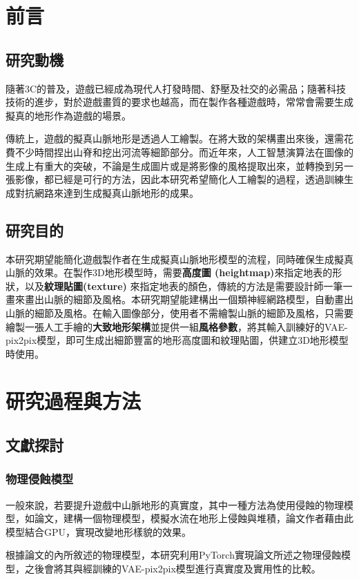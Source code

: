\documentclass[a4paper, 12pt]{article}
\begin{document}
\newpage
{}

\section{前言}
\subsection{研究動機}
隨著3C的普及，遊戲已經成為現代人打發時間、舒壓及社交的必需品；隨著科技技術的進步，對於遊戲畫質的要求也越高，而在製作各種遊戲時，常常會需要生成擬真的地形作為遊戲的場景。

傳統上，遊戲的擬真山脈地形是透過人工繪製。在將大致的架構畫出來後，還需花費不少時間捏出山脊和挖出河流等細節部分。而近年來，人工智慧演算法在圖像的生成上有重大的突破，不論是生成圖片或是將影像的風格提取出來，並轉換到另一張影像，都已經是可行的方法，因此本研究希望簡化人工繪製的過程，透過訓練生成對抗網路來達到生成擬真山脈地形的成果。

\subsection{研究目的}
本研究期望能簡化遊戲製作者在生成擬真山脈地形模型的流程，同時確保生成擬真山脈的效果。在製作3D地形模型時，需要\textbf{高度圖 (heightmap)}來指定地表的形狀，以及\textbf{紋理貼圖(texture)} 來指定地表的顏色，傳統的方法是需要設計師一筆一畫來畫出山脈的細節及風格。本研究期望能建構出一個類神經網路模型，自動畫出山脈的細節及風格。在輸入圖像部分，使用者不需繪製山脈的細節及風格，只需要繪製一張人工手繪的\textbf{大致地形架構}並提供一組\textbf{風格參數}，將其輸入訓練好的VAE-pix2pix模型，即可生成出細節豐富的地形高度圖和紋理貼圖，供建立3D地形模型時使用。
\section{研究過程與方法}
\subsection{文獻探討}
\subsubsection{物理侵蝕模型}
一般來說，若要提升遊戲中山脈地形的真實度，其中一種方法為使用侵蝕的物理模型，如論文\cite{jako2011fast}，建構一個物理模型，模擬水流在地形上侵蝕與堆積，論文作者藉由此模型結合GPU，實現改變地形樣貌的效果。

根據論文\cite{jako2011fast}的內所敘述的物理模型，本研究利用PyTorch實現論文\cite{jako2011fast}所述之物理侵蝕模型，之後會將其與經訓練的VAE-pix2pix模型進行真實度及實用性的比較。
\end{document}
